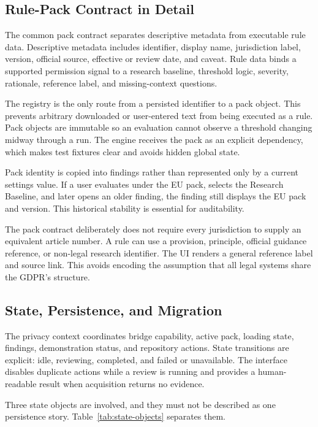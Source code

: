 \subsection{Rule-Pack Contract in Detail}

The common pack contract separates descriptive metadata from executable rule data. Descriptive metadata includes identifier, display name, jurisdiction label, version, official source, effective or review date, and caveat. Rule data binds a supported permission signal to a research baseline, threshold logic, severity, rationale, reference label, and missing-context questions.

The registry is the only route from a persisted identifier to a pack object. This prevents arbitrary downloaded or user-entered text from being executed as a rule. Pack objects are immutable so an evaluation cannot observe a threshold changing midway through a run. The engine receives the pack as an explicit dependency, which makes test fixtures clear and avoids hidden global state.

Pack identity is copied into findings rather than represented only by a current settings value. If a user evaluates under the EU pack, selects the Research Baseline, and later opens an older finding, the finding still displays the EU pack and version. This historical stability is essential for auditability.

The pack contract deliberately does not require every jurisdiction to supply an equivalent article number. A rule can use a provision, principle, official guidance reference, or non-legal research identifier. The UI renders a general reference label and source link. This avoids encoding the assumption that all legal systems share the GDPR's structure.

\subsection{State, Persistence, and Migration}

The privacy context coordinates bridge capability, active pack, loading state, findings, demonstration status, and repository actions. State transitions are explicit: idle, reviewing, completed, and failed or unavailable. The interface disables duplicate actions while a review is running and provides a human-readable result when acquisition returns no evidence.

Three state objects are involved, and they must not be described as one persistence story. Table~\ref{tab:state-objects} separates them.

